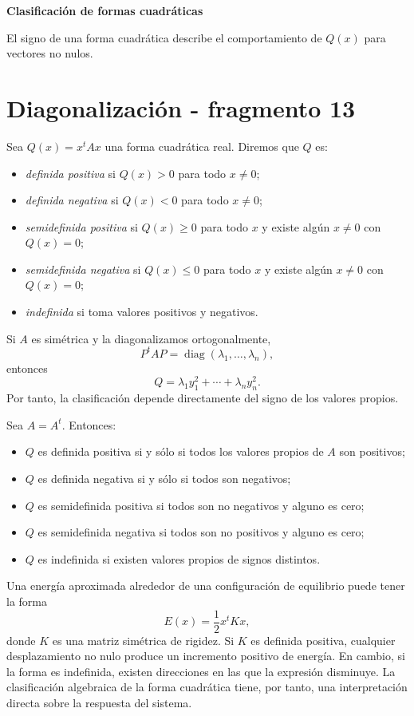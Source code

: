 \textbf{Clasificación de formas cuadráticas}

El signo de una forma cuadrática describe el comportamiento de $Q(x)$ para vectores no nulos.


\section{Diagonalización - fragmento 13}
\begin{definition}
Sea $Q(x)=x^tAx$ una forma cuadrática real. Diremos que $Q$ es:
\begin{itemize}
\item \emph{definida positiva} si $Q(x)>0$ para todo $x\neq0$;
\item \emph{definida negativa} si $Q(x)<0$ para todo $x\neq0$;
\item \emph{semidefinida positiva} si $Q(x)\geq0$ para todo $x$ y existe algún $x\neq0$ con $Q(x)=0$;
\item \emph{semidefinida negativa} si $Q(x)\leq0$ para todo $x$ y existe algún $x\neq0$ con $Q(x)=0$;
\item \emph{indefinida} si toma valores positivos y negativos.
\end{itemize}
\end{definition}

Si $A$ es simétrica y la diagonalizamos ortogonalmente,
\[
P^tAP=\operatorname{diag}(\lambda_1,\ldots,\lambda_n),
\]
entonces
\[
Q=\lambda_1y_1^2+\cdots+\lambda_ny_n^2.
\]
Por tanto, la clasificación depende directamente del signo de los valores propios.

\begin{theorem}
Sea $A=A^t$. Entonces:
\begin{itemize}
\item $Q$ es definida positiva si y sólo si todos los valores propios de $A$ son positivos;
\item $Q$ es definida negativa si y sólo si todos son negativos;
\item $Q$ es semidefinida positiva si todos son no negativos y alguno es cero;
\item $Q$ es semidefinida negativa si todos son no positivos y alguno es cero;
\item $Q$ es indefinida si existen valores propios de signos distintos.
\end{itemize}
\end{theorem}

\begin{example}
Una energía aproximada alrededor de una configuración de equilibrio puede tener la forma
\[
E(x)=\frac12x^tKx,
\]
donde $K$ es una matriz simétrica de rigidez. Si $K$ es definida positiva, cualquier desplazamiento no nulo produce un incremento positivo de energía. En cambio, si la forma es indefinida, existen direcciones en las que la expresión disminuye. La clasificación algebraica de la forma cuadrática tiene, por tanto, una interpretación directa sobre la respuesta del sistema.
\end{example}

